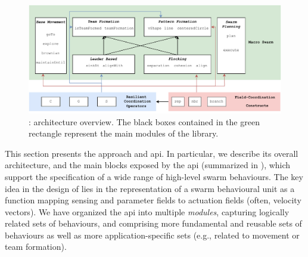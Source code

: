 \section{\MacroSwarm{}}
\label{coordination2023-macro:sec:contrib}

\begin{figure}[t]
  \includegraphics[width=\textwidth]{papers/coordination2023-macro/images/architecture.drawio.pdf}
  \caption[\MacroSwarm{}: architecture overview.]{\MacroSwarm{}: architecture overview. 
  The black boxes contained in the green rectangle 
  represent the main modules of the library.
  }\label{coordination2023-macro:fig:architecture}
\end{figure}

This section presents the \MacroSwarm{} approach and \ac{api}.
%
In particular, we describe its overall architecture, and the main blocks exposed by the \ac{api}
 (summarized in ), 
 which support the specification of a wide range of high-level swarm behaviours. 
%
The key idea in the design of \MacroSwarm{}  
 lies in the representation of a swarm behavioural unit 
 as a function mapping sensing and parameter fields 
 to actuation fields (often, velocity vectors).
%
We have organized the \ac{api}
 into multiple \emph{modules},
 capturing logically related sets of behaviours,
 and
 comprising more fundamental and reusable sets of behaviours
 as well as more application-specific sets (e.g., related to movement or team formation).

